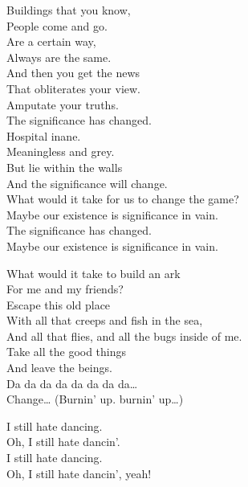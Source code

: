 
Buildings that you know, \\
People come and go. \\
Are a certain way, \\
Always are the same. \\
And then you get the news \\
That obliterates your view. \\
Amputate your truths. \\
The significance has changed. \\

Hospital inane. \\
Meaningless and grey. \\
But lie within the walls \\
And the significance will change. \\
What would it take for us to change the game? \\
Maybe our existence is significance in vain. \\
The significance has changed. \\
Maybe our existence is significance in vain. \\


What would it take to build an ark \\
For me and my friends? \\
Escape this old place \\
With all that creeps and fish in the sea, \\
And all that flies, and all the bugs inside of me. \\
Take all the good things \\
And leave the  beings. \\

Da da da da da da da da… \\

Change… (Burnin' up. burnin' up…) \\





I still hate dancing. \\
Oh, I still hate dancin'. \\
I still hate dancing. \\
Oh, I still hate dancin', yeah! \\

